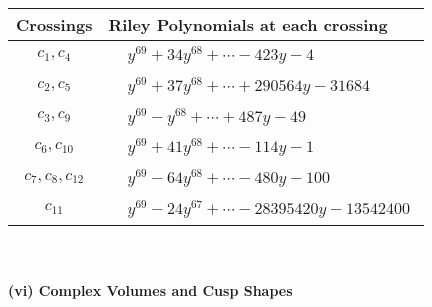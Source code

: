 \documentclass[1p]{elsarticle_modified}
\theoremstyle{definition}
\begin{document}
\begin{tabular}{m{50pt}|m{274pt}}
Crossings & \hspace{64pt}Riley Polynomials at each crossing \\
\hline $$\begin{aligned}c_{1},c_{4}\end{aligned}$$&$\begin{aligned}
&y^{69}+34 y^{68}+\cdots-423 y-4
\end{aligned}$\\
\hline $$\begin{aligned}c_{2},c_{5}\end{aligned}$$&$\begin{aligned}
&y^{69}+37 y^{68}+\cdots+290564 y-31684
\end{aligned}$\\
\hline $$\begin{aligned}c_{3},c_{9}\end{aligned}$$&$\begin{aligned}
&y^{69}- y^{68}+\cdots+487 y-49
\end{aligned}$\\
\hline $$\begin{aligned}c_{6},c_{10}\end{aligned}$$&$\begin{aligned}
&y^{69}+41 y^{68}+\cdots-114 y-1
\end{aligned}$\\
\hline $$\begin{aligned}c_{7},c_{8},c_{12}\end{aligned}$$&$\begin{aligned}
&y^{69}-64 y^{68}+\cdots-480 y-100
\end{aligned}$\\
\hline $$\begin{aligned}c_{11}\end{aligned}$$&$\begin{aligned}
&y^{69}-24 y^{67}+\cdots-28395420 y-13542400
\end{aligned}$\\
\hline
\end{tabular}\\~\\
\newpage\flushleft \textbf{(vi) Complex Volumes and Cusp Shapes}
\end{document}
